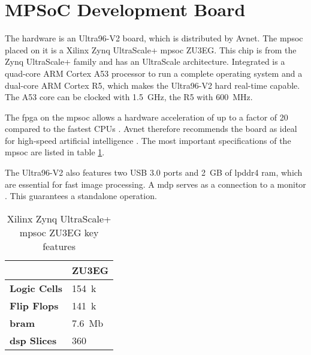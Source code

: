 \section{MPSoC Development Board}
\label{sec:hardware:mpsoc_development_board}

The hardware is an Ultra96-V2 board, which is distributed by Avnet.
The \acrfull{mpsoc} placed on it is a Xilinx Zynq UltraScale+ \acrshort{mpsoc} ZU3EG.
This chip is from the Zynq UltraScale+ family and has an UltraScale architecture.
Integrated is a quad-core ARM Cortex A53 processor to run a complete operating system and a dual-core ARM Cortex R5, which makes the Ultra96-V2 hard real-time capable.
The A53 core can be clocked with \SI{1.5}{GHz}, the R5 with \SI{600}{MHz}.

The \acrshort{fpga} on the \acrshort{mpsoc} allows a hardware acceleration of up to a factor of 20 compared to the fastest CPUs \cite{acceleration_xilinx}.
Avnet therefore recommends the board as ideal for high-speed artificial intelligence \cite{ai_resources_xilinx}.
The most important specifications of the \acrshort{mpsoc} are listed in table \ref{tab:specs_MPSoC}.

The Ultra96-V2 also features two USB 3.0 ports and \SI{2}{GB} of \acrfull{lpddr4} \acrshort{ram}, which are essential for fast image processing.
A \acrfull{mdp} serves as a connection to a monitor \cite{avnet_ultra96v2}.
This guarantees a standalone operation.

\begin{table}[h]
  \caption{Xilinx Zynq UltraScale+ \acrshort{mpsoc} ZU3EG key features \cite{xilinx_zynq}}
  \label{tab:specs_MPSoC}
  \centering
  \begin{tabular}{ll}
    \toprule
     & \textbf{ZU3EG} \\
    \midrule
    \textbf{Logic Cells} & \SI{154}{k} \\
    \textbf{Flip Flops} & \SI{141}{k} \\
    \textbf{\acrshort{bram}} & \SI{7.6}{Mb} \\
    \textbf{\acrshort{dsp} Slices} & 360 \\
    \bottomrule
  \end{tabular}
\end{table}
